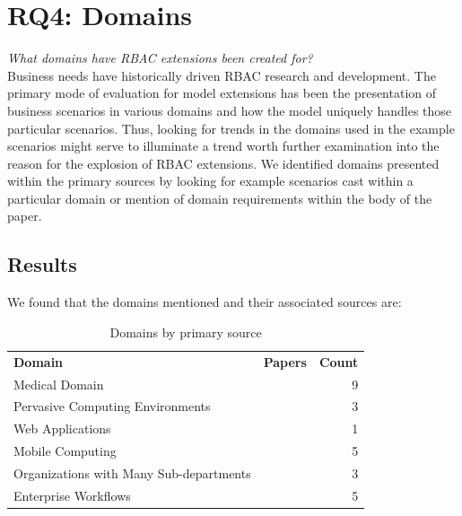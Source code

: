 \section{RQ4: Domains} \label{sec:domains}

\textit{What domains have RBAC extensions been created for?}
\\

Business needs have historically driven RBAC research and development.  The primary mode of evaluation for
model extensions has been the presentation of business scenarios in various domains and how the model
uniquely handles those particular scenarios.  Thus, looking for trends in the domains used in the example
scenarios might serve to illuminate a trend worth further examination into the reason for the explosion of
RBAC extensions.  We identified domains presented within the primary sources by looking for example
scenarios cast within a particular domain or mention of domain requirements within the body of the paper.

\subsection{Results}

We found that the domains mentioned and their associated sources are:

\begin{table}
\centering
\caption{Domains by primary source}
\vspace{0.1 in}
\begin{tabular*}{.9\linewidth}{| p{.45\linewidth} | p{.3\linewidth} | r | }
\cline{1-3}

\textbf{Domain} & \textbf{Papers} & \textbf{Count} \\ \cline{1-3}
Medical Domain
&
\cite{alam06:constraint}
\cite{tzelepi01:flexible}
\cite{motta03:contextual}
\cite{ni2010privacy}
\cite{damiani2007geo}
\cite{hansen2003spatial}
\cite{samuel07:spatio-temporal}
\cite{aich09:role}
\cite{zhou2007team}
&
9 \\ \cline{1-3}
Pervasive Computing Environments
& 
\cite{huang06:pervasive}
\cite{chen08:spatio-temporal}
\cite{ray07:spatio}
&
3 \\ \cline{1-3}
Web Applications
& 
\cite{masoumzadeh2008purbac}
\cite{haibo05:context}
&
1 \\ \cline{1-3}
Mobile Computing
& 
\cite{thein2011leveraging}
\cite{zou2009crbac}
\cite{chandran05:llt}
\cite{ray07:spatio}
\cite{aich09:role}
&
5 \\ \cline{1-3}
Organizations with Many Sub-departments
& 
\cite{yamazaki04:designing}
\cite{jian2008extended}
\cite{yao2008task}
&
3 \\ \cline{1-3}
Enterprise Workflows
&
\cite{cholewka00:acontext-sensitive}
\cite{bao08:role}
\cite{zhang06:collaborative}
\cite{oh2003task}
\cite{joshi05:generalized}
&
5 \\ \cline{1-3}

\end{tabular*}
\label{tab:implementations}
\end{table}

